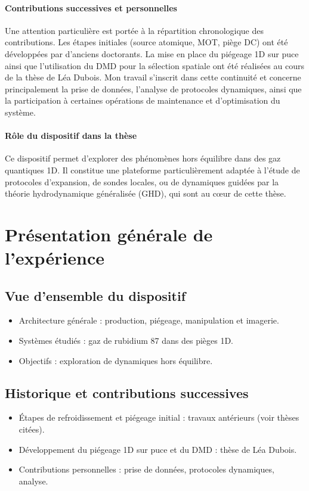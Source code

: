 \paragraph{Contributions successives et personnelles}  
Une attention particulière est portée à la répartition chronologique des contributions. Les étapes initiales (source atomique, MOT, piège DC) ont été développées par d’anciens doctorants. La mise en place du piégeage 1D sur puce ainsi que l’utilisation du DMD pour la sélection spatiale ont été réalisées au cours de la thèse de Léa Dubois. Mon travail s’inscrit dans cette continuité et concerne principalement la prise de données, l’analyse de protocoles dynamiques, ainsi que la participation à certaines opérations de maintenance et d’optimisation du système.

\paragraph{Rôle du dispositif dans la thèse}  
Ce dispositif permet d’explorer des phénomènes hors équilibre dans des gaz quantiques 1D. Il constitue une plateforme particulièrement adaptée à l’étude de protocoles d’expansion, de sondes locales, ou de dynamiques guidées par la théorie hydrodynamique généralisée (GHD), qui sont au cœur de cette thèse.




\section{Présentation générale de l’expérience}
\subsection{Vue d’ensemble du dispositif}
\begin{itemize}
    \item Architecture générale : production, piégeage, manipulation et imagerie.
    \item Systèmes étudiés : gaz de rubidium 87 dans des pièges 1D.
    \item Objectifs : exploration de dynamiques hors équilibre.
\end{itemize}

\subsection{Historique et contributions successives}
\begin{itemize}
    \item Étapes de refroidissement et piégeage initial : travaux antérieurs (voir thèses citées).
    \item Développement du piégeage 1D sur puce et du DMD : thèse de Léa Dubois.
    \item Contributions personnelles : prise de données, protocoles dynamiques, analyse.
\end{itemize}

